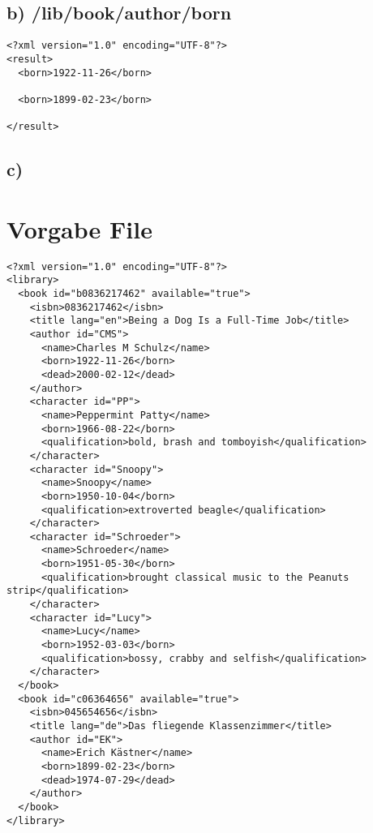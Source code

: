 \documentclass{az_article}
\begin{document}
\subsection{b) /lib/book/author/born}
\label{sec:org414aad7}
\begin{verbatim}
<?xml version="1.0" encoding="UTF-8"?>
<result>
  <born>1922-11-26</born>

  <born>1899-02-23</born>

</result>
\end{verbatim}

\subsection{c)}
\label{sec:org7021094}
\section{Vorgabe File}
\label{sec:orgc3d654c}
\begin{verbatim}
<?xml version="1.0" encoding="UTF-8"?>
<library>
  <book id="b0836217462" available="true">
    <isbn>0836217462</isbn>
    <title lang="en">Being a Dog Is a Full-Time Job</title>
    <author id="CMS">
      <name>Charles M Schulz</name>
      <born>1922-11-26</born>
      <dead>2000-02-12</dead>
    </author>
    <character id="PP">
      <name>Peppermint Patty</name>
      <born>1966-08-22</born>
      <qualification>bold, brash and tomboyish</qualification>
    </character>
    <character id="Snoopy">
      <name>Snoopy</name>
      <born>1950-10-04</born>
      <qualification>extroverted beagle</qualification>
    </character>
    <character id="Schroeder">
      <name>Schroeder</name>
      <born>1951-05-30</born>
      <qualification>brought classical music to the Peanuts strip</qualification>
    </character>
    <character id="Lucy">
      <name>Lucy</name>
      <born>1952-03-03</born>
      <qualification>bossy, crabby and selfish</qualification>
    </character>
  </book>
  <book id="c06364656" available="true">
    <isbn>045654656</isbn>
    <title lang="de">Das fliegende Klassenzimmer</title>
    <author id="EK">
      <name>Erich Kästner</name>
      <born>1899-02-23</born>
      <dead>1974-07-29</dead>
    </author>
  </book>
</library>
\end{verbatim}
\end{document}
